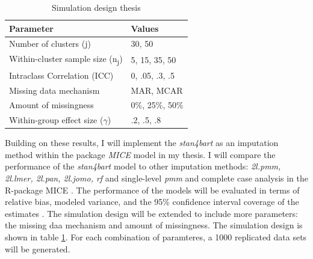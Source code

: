 \documentclass[10pt, a4paper, titlepage]{article}
\begin{document}
\begin{table}
\centering
\caption{Simulation design thesis}
\label{tab:simulationparameters2}
\begin{tabular}{l|l}
\textbf{Parameter}                                  & \textbf{Values} \\ \hline
Number of clusters (j)                              & 30, 50          \\
Within-cluster sample size (n\textsubscript{j})     & 5, 15, 35, 50   \\
Intraclass Correlation (ICC)                        & 0, .05, .3, .5  \\
Missing data mechanism                              & MAR, MCAR       \\
Amount of missingness                               & 0\%, 25\%, 50\% \\
Within-group effect size ($\gamma$)                 & .2, .5, .8
\end{tabular}
\end{table}

Building on these results, I will implement the \textit{stan4bart} as an imputation method within the package \textit{MICE} \citep{buuren2011} model in my thesis. I will compare the performance of the \textit{stan4bart} model to other imputation methods: \textit{2l.pmm, 2l.lmer, 2l.pan, 2l.jomo, rf} and single-level \textit{pmm} and complete case analysis in the R-package MICE \citep{buuren2011}. The performance of the models will be evaluated in terms of relative bias, modeled variance, and the 95\% confidence interval coverage of the estimates \citep{oberman2023}. The simulation design will be extended to include more parameters: the missing daa mechanism and amount of missingness. The simulation design is shown in table \ref{tab:simulationparameters2}. For each combination of paramteres, a 1000 replicated data sets will be generated.

\newpage


\end{document}
